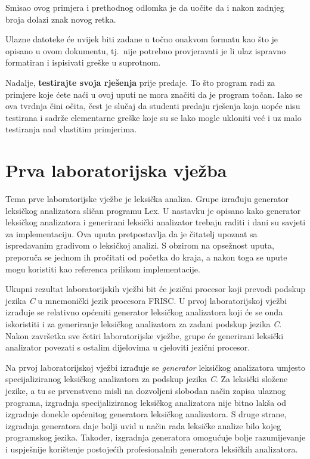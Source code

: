 \documentclass[times, 12pt, utf8]{book}
\begin{document}
Smisao ovog primjera i prethodnog odlomka je da uočite da i nakon zadnjeg broja dolazi znak novog retka.

Ulazne datoteke će uvijek biti zadane u točno onakvom formatu kao što je opisano u ovom dokumentu, tj.~nije potrebno provjeravati je li ulaz ispravno formatiran i ispisivati greške u suprotnom.

Nadalje, \textbf{testirajte svoja rješenja} prije predaje.
To što program radi za primjere koje ćete naći u ovoj uputi ne mora značiti da je program točan.
Iako se ova tvrdnja čini očita, čest je slučaj da studenti predaju rješenja koja uopće nisu testirana i sadrže elementarne greške koje su se lako mogle ukloniti već i uz malo testiranja nad vlastitim primjerima.


\chapter{Prva laboratorijska vježba}\label{chap:I}
Tema prve laboratorijske vježbe je leksička analiza.
Grupe izrađuju generator leksičkog analizatora sličan programu Lex.
U nastavku je opisano kako generator leksičkog analizatora i generirani leksički analizator trebaju raditi i dani su savjeti za implementaciju.
Ova uputa pretpostavlja da je čitatelj upoznat sa ispredavanim gradivom o leksičkoj analizi.
S obzirom na opsežnost uputa, preporuča se jednom ih pročitati od početka do kraja, a nakon toga se upute mogu koristiti kao referenca prilikom implementacije.

Ukupni rezultat laboratorijskih vježbi bit će jezični procesor koji prevodi podskup jezika \emph{C} u mnemonički jezik procesora FRISC.
U prvoj laboratorijskoj vježbi izrađuje se relativno općeniti generator leksičkog analizatora koji će se onda iskoristiti i za generiranje leksičkog analizatora za zadani podskup jezika \emph{C}.
Nakon završetka sve četiri laboratorijske vježbe, grupe će generirani leksički analizator povezati s ostalim dijelovima u cjeloviti jezični procesor.

Na prvoj laboratorijskoj vježbi izrađuje se \emph{generator} leksičkog analizatora umjesto specijaliziranog leksičkog analizatora za podskup jezika \emph{C}.
Za leksički složene jezike, a tu se prvenstveno misli na dozvoljeni slobodan način zapisa ulaznog programa, izgradnja specijaliziranog leksičkog analizatora nije bitno lakša od izgradnje donekle općenitog generatora leksičkog analizatora.
S druge strane, izgradnja generatora daje bolji uvid u način rada leksičke analize bilo kojeg programskog jezika.
Također, izgradnja generatora omogućuje bolje razumijevanje i uspješnije korištenje postojećih profesionalnih generatora leksičkih analizatora.
\end{document}
